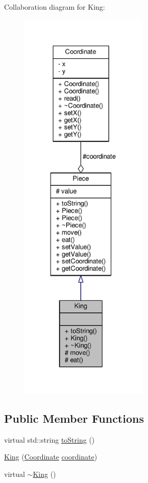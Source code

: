 Collaboration diagram for King\+:
\nopagebreak
\begin{figure}[H]
\begin{center}
\leavevmode
\includegraphics[height=550pt]{class_king__coll__graph}
\end{center}
\end{figure}
\subsection*{Public Member Functions}
\begin{DoxyCompactItemize}
\item 
virtual std\+::string \hyperlink{class_king_a445fa11a84a95f5257eea4fb0a4f4839}{to\+String} ()
\item 
\hyperlink{class_king_a61f66f3da9c9b8cda2541fb3e1be8743}{King} (\hyperlink{class_coordinate}{Coordinate} \hyperlink{class_piece_a9e92373c8fffc1f5efb20d62204b70cf}{coordinate})
\item 
virtual \hyperlink{class_king_aac368ce96e2b12f62e3608d27262e941}{$\sim$\+King} ()
\end{DoxyCompactItemize}

